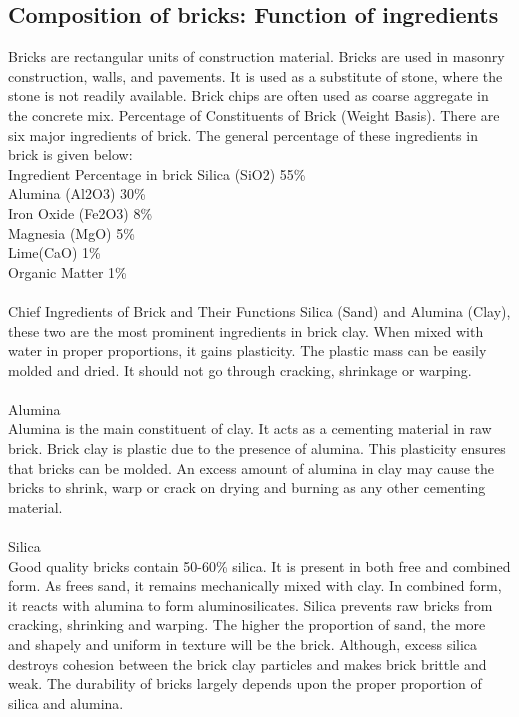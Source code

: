 \documentclass{article}
\begin{document}
\newpage
\subsection{Composition of bricks: Function of ingredients}
Bricks are rectangular units of construction material. Bricks are used in masonry construction, walls, and pavements. It is used as a substitute of stone, where the stone is not readily available. Brick chips are often used as coarse aggregate in the concrete mix.
Percentage of Constituents of Brick (Weight Basis).
There are six major ingredients of brick. The general percentage of these ingredients in brick is given below:\\
Ingredient	Percentage in brick
Silica (SiO2)	55\%\\
Alumina (Al2O3)	30\%\\
Iron Oxide (Fe2O3)	8\%\\
Magnesia (MgO)	5\%\\
Lime(CaO)	1\%\\
Organic Matter	1\%\\
\vspace{0.1cm}\\
Chief Ingredients of Brick and Their Functions
Silica (Sand) and Alumina (Clay), these two are the most prominent ingredients in brick clay. When mixed with water in proper proportions, it gains plasticity. The plastic mass can be easily molded and dried. It should not go through cracking, shrinkage or warping.\\
\vspace{0.1cm}\\
Alumina\\
Alumina is the main constituent of clay. It acts as a cementing material in raw brick. Brick clay is plastic due to the presence of alumina. This plasticity ensures that bricks can be molded. An excess amount of alumina in clay may cause the bricks to shrink, warp or crack on drying and burning as any other cementing material.\\
\vspace{0.1cm}\\
Silica\\
Good quality bricks contain 50-60\% silica. It is present in both free and combined form. As frees sand, it remains mechanically mixed with clay. In combined form, it reacts with alumina to form aluminosilicates. Silica prevents raw bricks from cracking, shrinking and warping. The higher the proportion of sand, the more and shapely and uniform in texture will be the brick. Although, excess silica destroys cohesion between the brick clay particles and makes brick brittle and weak. The durability of bricks largely depends upon the proper proportion of silica and alumina.\\
\end{document}
